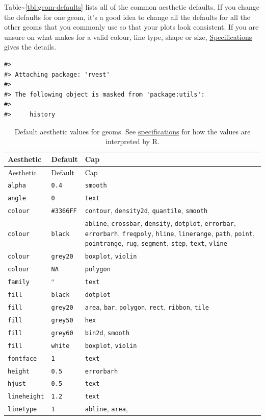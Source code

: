 Table\textasciitilde{}\ref{tbl:geom-defaults} lists all of the common
aesthetic defaults. If you change the defaults for one geom, it's a good
idea to change all the defaults for all the other geoms that you
commonly use so that your plots look consistent. If you are unsure on
what makes for a valid colour, line type, shape or size,
\hyperref[cha:specifications]{Specifications} gives the details.

\begin{verbatim}
#> 
#> Attaching package: 'rvest'
#> 
#> The following object is masked from 'package:utils':
#> 
#>     history
\end{verbatim}

\begin{longtable}[c]{@{}lll@{}}
\caption{Default aesthetic values for geoms. See
\hyperref[cha:specifications]{specifications} for how the values are
interpreted by R.}\tabularnewline
\toprule
Aesthetic & Default & Cap\tabularnewline
\midrule
\endfirsthead
\toprule
Aesthetic & Default & Cap\tabularnewline
\midrule
\endhead
\texttt{alpha} & \texttt{0.4} & \texttt{smooth}\tabularnewline
\texttt{angle} & \texttt{0} & \texttt{text}\tabularnewline
\texttt{colour} & \texttt{\#3366FF} & \texttt{contour},
\texttt{density2d}, \texttt{quantile}, \texttt{smooth}\tabularnewline
\texttt{colour} & \texttt{black} & \texttt{abline}, \texttt{crossbar},
\texttt{density}, \texttt{dotplot}, \texttt{errorbar},
\texttt{errorbarh}, \texttt{freqpoly}, \texttt{hline},
\texttt{linerange}, \texttt{path}, \texttt{point}, \texttt{pointrange},
\texttt{rug}, \texttt{segment}, \texttt{step}, \texttt{text},
\texttt{vline}\tabularnewline
\texttt{colour} & \texttt{grey20} & \texttt{boxplot},
\texttt{violin}\tabularnewline
\texttt{colour} & \texttt{NA} & \texttt{polygon}\tabularnewline
\texttt{family} & `` & \texttt{text}\tabularnewline
\texttt{fill} & \texttt{black} & \texttt{dotplot}\tabularnewline
\texttt{fill} & \texttt{grey20} & \texttt{area}, \texttt{bar},
\texttt{polygon}, \texttt{rect}, \texttt{ribbon},
\texttt{tile}\tabularnewline
\texttt{fill} & \texttt{grey50} & \texttt{hex}\tabularnewline
\texttt{fill} & \texttt{grey60} & \texttt{bin2d},
\texttt{smooth}\tabularnewline
\texttt{fill} & \texttt{white} & \texttt{boxplot},
\texttt{violin}\tabularnewline
\texttt{fontface} & \texttt{1} & \texttt{text}\tabularnewline
\texttt{height} & \texttt{0.5} & \texttt{errorbarh}\tabularnewline
\texttt{hjust} & \texttt{0.5} & \texttt{text}\tabularnewline
\texttt{lineheight} & \texttt{1.2} & \texttt{text}\tabularnewline
\texttt{linetype} & \texttt{1} & \texttt{abline}, \texttt{area},

\end{longtable}
